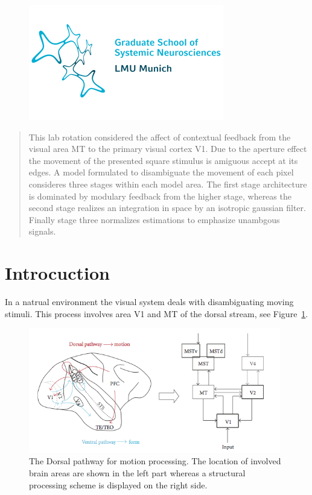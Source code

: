\documentclass[a4paper]{article}
\begin{document}
\begin{titlepage}
\begin{center}
\vspace{0.1cm}
\begin{figure}[ht]
\centering
\includegraphics[scale=0.40]{GSN}
\end{figure}
\vspace{1cm}
\end{center}

\begin{abstract}

This lab rotation considered the affect of contextual feedback from the visual area MT to the primary visual cortex V1. Due to the aperture effect the movement of the presented square stimulus is amiguous accept at its edges. A model formulated to disambiguate the movement of each pixel consideres three stages within each model area. The first stage architecture is dominated by modulary feedback from the higher stage, whereas the second stage realizes an integration in space by an isotropic gaussian filter. Finally stage three normalizes estimations to emphasize unambgous signals.
\end{abstract}
\thispagestyle{empty}
\end{titlepage}

\newpage
\tableofcontents

\newpage
\section{Introcuction}
In a natrual environment the visual system deals with disambiguating moving stimuli. This process involves area V1 and MT of the dorsal stream, see Figure~\ref{fig:bouecke1}.\\

\vspace{0.5cm}
\begin{figure}[ht]
\centering
\includegraphics[width=11cm]{bouecke1}
\caption{The Dorsal pathway for motion processing. The location of involved brain areas are shown in the left part whereas a structural processing scheme is displayed on the right side.}
\label{fig:bouecke1}
\end{figure}
\vspace{0.5cm}
\end{document}
